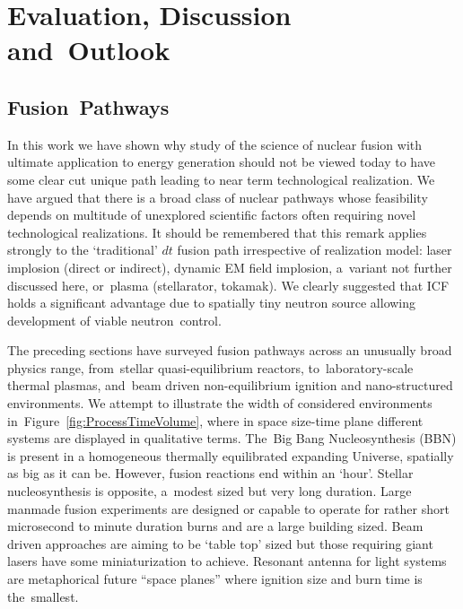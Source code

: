\documentclass[particles,article,accept,pdftex,moreauthors]{Definitions/mdpi}
\begin{document}
\section{Evaluation, Discussion and~Outlook}\label{sec:Dis}
\subsection{Fusion~Pathways}
In this work we have shown why study of the science of nuclear fusion with ultimate application to energy generation should not be viewed today to have some clear cut unique path leading to near term technological realization. We have argued that there is a broad class of nuclear pathways whose feasibility depends on multitude of unexplored scientific factors often requiring novel technological realizations. It should be remembered that this remark applies strongly to the `traditional' $dt$ fusion path irrespective of realization model: laser implosion (direct or indirect), dynamic EM field implosion, a~variant not further discussed here, or~plasma (stellarator, tokamak). We clearly suggested that ICF holds a significant advantage due to spatially tiny neutron source allowing development of viable neutron~control. 

The preceding sections have surveyed fusion pathways across an unusually broad physics range, from~stellar quasi-equilibrium reactors, to~laboratory-scale thermal plasmas, and~beam driven non-equilibrium ignition and nano-structured environments. We attempt to illustrate the width of considered environments in~Figure~\ref{fig:ProcessTimeVolume}, where in space size-time plane different systems are displayed in qualitative terms. The~Big Bang Nucleosynthesis (BBN) is present in a homogeneous thermally equilibrated expanding Universe, spatially as big as it can be. However, fusion reactions end within an `hour'. Stellar nucleosynthesis is opposite, a~modest sized but very long duration. Large manmade fusion experiments are designed or capable to operate for rather short microsecond to minute duration burns and are a large building sized. Beam driven approaches are aiming to be `table top' sized but those requiring giant lasers have some miniaturization to achieve. Resonant antenna for light systems are metaphorical future ``space planes'' where ignition size and burn time is the~smallest. 
\end{document}
